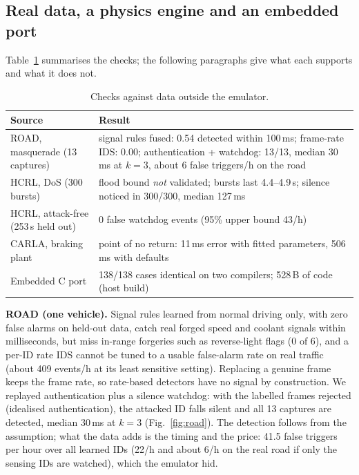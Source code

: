 \documentclass[conference]{IEEEtran}
\begin{document}
\subsection{Real data, a physics engine and an embedded port}
Table~\ref{tab:real} summarises the checks; the following paragraphs give what each supports and what it does not.

\begin{table}[t]
\caption{Checks against data outside the emulator.}
\label{tab:real}
\centering
\footnotesize
\begin{tabular}{@{}p{}p{}@{}}
\toprule
Source & Result \\
\midrule
ROAD, masquerade (13 captures) & signal rules fused: 0.54 detected within 100\,ms; frame-rate IDS: 0.00; authentication + watchdog: 13/13, median 30\,ms at $k{=}3$, about 6 false triggers/h on the road \\
HCRL, DoS (300 bursts) & flood bound \emph{not} validated; bursts last 4.4--4.9\,s; silence noticed in 300/300, median 127\,ms \\
HCRL, attack-free (253\,s held out) & 0 false watchdog events (95\% upper bound 43/h) \\
CARLA, braking plant & point of no return: 11\,ms error with fitted parameters, 506\,ms with defaults \\
Embedded C port & 138/138 cases identical on two compilers; 528\,B of code (host build) \\
\bottomrule
\end{tabular}
\end{table}

\textbf{ROAD (one vehicle).} Signal rules learned from normal driving only, with zero false alarms on held-out data, catch real forged speed and coolant signals within milliseconds, but miss in-range forgeries such as reverse-light flags (0 of 6), and a per-ID rate IDS cannot be tuned to a usable false-alarm rate on real traffic (about 409 events/h at its least sensitive setting). Replacing a genuine frame keeps the frame rate, so rate-based detectors have no signal by construction. We replayed authentication plus a silence watchdog: with the labelled frames rejected (idealised authentication), the attacked ID falls silent and all 13 captures are detected, median 30\,ms at $k=3$ (Fig.~\ref{fig:road}). The detection follows from the assumption; what the data adds is the timing and the price: 41.5 false triggers per hour over all learned IDs (22/h and about 6/h on the real road if only the sensing IDs are watched), which the emulator hid.
\end{document}
